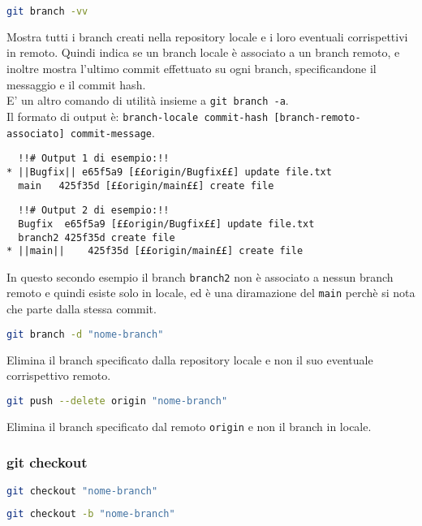 \begin{lstlisting}[language=bash]
	git branch -vv
\end{lstlisting}
Mostra tutti i branch creati nella repository locale e i loro eventuali corrispettivi in remoto. Quindi indica se un branch locale è associato a un branch remoto, e inoltre mostra l'ultimo commit effettuato su ogni branch, specificandone il messaggio e il commit hash.\\
E' un altro comando di utilità insieme a \texttt{git branch -a}.\\
Il formato di output è: \texttt{branch-locale commit-hash [branch-remoto-associato] commit-message}.
\begin{lstlisting}
  !!# Output 1 di esempio:!!
* ||Bugfix|| e65f5a9 [££origin/Bugfix££] update file.txt
  main   425f35d [££origin/main££] create file
\end{lstlisting}
\begin{lstlisting}
  !!# Output 2 di esempio:!!
  Bugfix  e65f5a9 [££origin/Bugfix££] update file.txt
  branch2 425f35d create file
* ||main||    425f35d [££origin/main££] create file
\end{lstlisting}
In questo secondo esempio il branch \texttt{branch2} non è associato a nessun branch remoto e quindi esiste solo in locale, ed è una diramazione del \texttt{main} perchè si nota che parte dalla stessa commit.\\

\begin{lstlisting}[language=bash]
	git branch -d "nome-branch"
\end{lstlisting}
Elimina il branch specificato dalla repository locale e non il suo eventuale corrispettivo remoto.\\

\begin{lstlisting}[language=bash]
	git push --delete origin "nome-branch"
\end{lstlisting}
Elimina il branch specificato dal remoto \texttt{origin} e non il branch in locale.\\

\subsubsection{git checkout}
\begin{lstlisting}[language=bash]
	git checkout "nome-branch" 
\end{lstlisting}
\begin{lstlisting}[language=bash]
	git checkout -b "nome-branch" 
\end{lstlisting}

